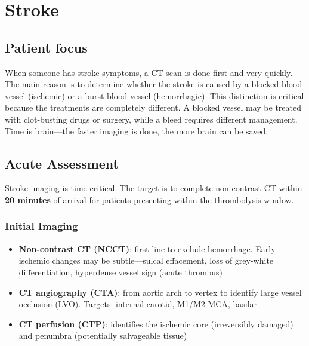 \chapter{Stroke}

\section*{Patient focus}
When someone has stroke symptoms, a CT scan is done first and very quickly. The main reason is to determine whether the stroke is caused by a blocked blood vessel (ischemic) or a burst blood vessel (hemorrhagic). This distinction is critical because the treatments are completely different. A blocked vessel may be treated with clot-busting drugs or surgery, while a bleed requires different management. Time is brain---the faster imaging is done, the more brain can be saved.


\label{ch:ch60_stroke}

\section{Acute Assessment}
Stroke imaging is time-critical. The target is to complete non-contrast CT within \textbf{20 minutes} of arrival for patients presenting within the thrombolysis window.

\subsection{Initial Imaging}
\begin{itemize}
  \item \textbf{Non-contrast CT (NCCT)}: first-line to exclude hemorrhage. Early ischemic changes may be subtle---sulcal effacement, loss of grey-white differentiation, hyperdense vessel sign (acute thrombus)
  \item \textbf{CT angiography (CTA)}: from aortic arch to vertex to identify large vessel occlusion (LVO). Targets: internal carotid, M1/M2 MCA, basilar
  \item \textbf{CT perfusion (CTP)}: identifies the ischemic core (irreversibly damaged) and penumbra (potentially salvageable tissue)
\end{itemize}

